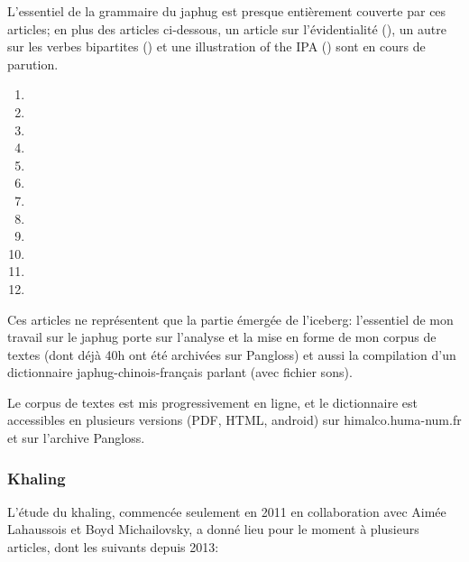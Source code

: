 \documentclass[oldfontcommands,oneside,a4paper,11pt]{article}
\begin{document}
L'essentiel de la grammaire du japhug est presque entièrement couverte par ces articles; en plus des articles ci-dessous, un article sur l'évidentialité (\citealt{jacques19egophoric}), un autre sur les verbes bipartites (\citealt{jacques18bipartite}) et une illustration of the IPA (\citealt{jacques18ipa}) sont en cours de parution.

\begin{enumerate}
\item {}
\item {}
\item {}
\item {}
\item {}
\item {}
\item {}
\item {}
\item {}
\item {}
\item  {}
\item {}   
\end{enumerate} 

Ces articles ne représentent que la partie émergée de l'iceberg: l'essentiel de mon travail sur le japhug porte sur l'analyse et la mise en forme de mon corpus de textes (dont déjà 40h ont été archivées sur Pangloss) et aussi la compilation d'un dictionnaire japhug-chinois-français parlant (avec fichier sons). 

Le corpus de textes est mis progressivement en ligne, et le dictionnaire est accessibles en plusieurs versions (PDF, HTML, android) sur himalco.huma-num.fr et sur l'archive Pangloss.


\subsubsection{Khaling} \label{sec:khaling}
L'étude du khaling, commencée seulement en 2011 en collaboration avec Aimée Lahaussois et Boyd Michailovsky, a donné lieu pour le moment à plusieurs articles, dont les suivants depuis 2013:
 
\end{document}
